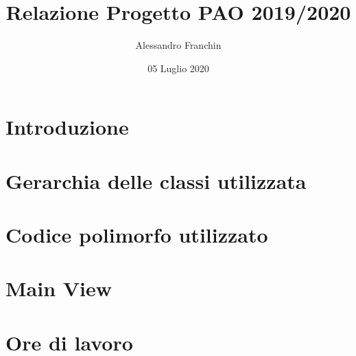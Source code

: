 \documentclass[12pt, letterpaper]{article}
\title{Relazione Progetto PAO 2019/2020}
\author{Alessandro Franchin}
\date{05 Luglio 2020}
\begin{document}
\begin{titlepage}
    \maketitle
\end{titlepage}
\clearpage
\tableofcontents
\newpage


\section*{Introduzione}
\label{sec:introduzione}



\newpage
\section*{Gerarchia delle classi utilizzata}
\label{sec:gerarchia}


\newpage
\section*{Codice polimorfo utilizzato}
\label{sec:polimorfo}


\newpage
\section*{Main View}
\label{sec:introduzione}


\newpage
\section*{Ore di lavoro}
\label{sec:ore}

\end{document}
